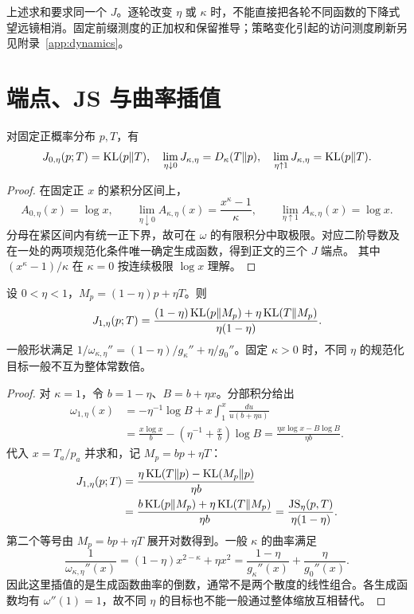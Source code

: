 上述求和要求同一个 $J$。逐轮改变 $\eta$ 或 $\kappa$ 时，不能直接把各轮不同函数的下降式望远镜相消。固定前缀测度的正加权和保留推导；策略变化引起的访问测度刷新另见附录~\ref{app:dynamics}。

\section{端点、JS 与曲率插值}
\begin{proposition}[教师目标的连续端点]
对固定正概率分布 $p,T$，有
\begin{equation}
J_{0,\eta}(p;T)=\operatorname{KL}(p\Vert T),\quad
\lim_{\eta\downarrow0}J_{\kappa,\eta}=D_\kappa(T\Vert p),\quad
\lim_{\eta\uparrow1}J_{\kappa,\eta}=\operatorname{KL}(p\Vert T).
\end{equation}
\end{proposition}
\begin{proof}
在固定正 $x$ 的紧积分区间上，
\begin{equation}
A_{0,\eta}(x)=\log x,\qquad
\lim_{\eta\downarrow0}A_{\kappa,\eta}(x)=\frac{x^\kappa-1}{\kappa},
\qquad
\lim_{\eta\uparrow1}A_{\kappa,\eta}(x)=\log x.
\end{equation}
分母在紧区间内有统一正下界，故可在 $\omega$ 的有限积分中取极限。对应二阶导数及在一处的两项规范化条件唯一确定生成函数，得到正文的三个 $J$ 端点。
其中 $(x^\kappa-1)/\kappa$ 在 $\kappa=0$ 按连续极限 $\log x$ 理解。
\end{proof}

\begin{proposition}[JS 端点与曲率插值]
设 $0<\eta<1$，$M_p=(1-\eta)p+\eta T$。则
\begin{equation}
J_{1,\eta}(p;T)=
\frac{(1-\eta)\operatorname{KL}(p\Vert M_p)+\eta\operatorname{KL}(T\Vert M_p)}{\eta(1-\eta)}.
\end{equation}
一般形状满足 $1/\omega_{\kappa,\eta}''=(1-\eta)/g_\kappa''+\eta/g_0''$。固定 $\kappa>0$ 时，不同 $\eta$ 的规范化目标一般不互为整体常数倍。
\end{proposition}
\begin{proof}
对 $\kappa=1$，令 $b=1-\eta$、$B=b+\eta x$。分部积分给出
\begin{align}
\omega_{1,\eta}(x)
&=-\eta^{-1}\log B+x\int_1^x\frac{du}{u(b+\eta u)}\\
&=\frac{x\log x}{b}-\left(\eta^{-1}+\frac xb\right)\log B
=\frac{\eta x\log x-B\log B}{\eta b}.
\end{align}
代入 $x=T_a/p_a$ 并求和，记 $M_p=bp+\eta T$：
\begin{align}
J_{1,\eta}(p;T)
&=\frac{\eta\operatorname{KL}(T\Vert p)-\operatorname{KL}(M_p\Vert p)}{\eta b}\\
&=\frac{b\operatorname{KL}(p\Vert M_p)+\eta\operatorname{KL}(T\Vert M_p)}{\eta b}
=\frac{\operatorname{JS}_\eta(p,T)}{\eta(1-\eta)}.
\label{eq:JS}
\end{align}
第二个等号由 $M_p=bp+\eta T$ 展开对数得到。一般 $\kappa$ 的曲率满足
\begin{equation}
\frac1{\omega_{\kappa,\eta}''(x)}
=(1-\eta)x^{2-\kappa}+\eta x^2
=\frac{1-\eta}{g_\kappa''(x)}+\frac{\eta}{g_0''(x)}.
\end{equation}
因此这里插值的是生成函数曲率的倒数，通常不是两个散度的线性组合。各生成函数均有 $\omega''(1)=1$，故不同 $\eta$ 的目标也不能一般通过整体缩放互相替代。
\end{proof}


